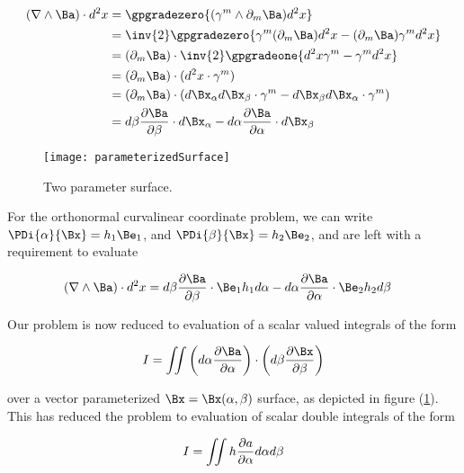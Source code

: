 \begin{align*}
(\grad \wedge \Ba) \cdot d^2 x
&=
\gpgradezero{ (\gamma^m \wedge \partial_m \Ba) d^2 x} \\
&=
\inv{2} \gpgradezero{ \gamma^m (\partial_m \Ba) d^2 x - (\partial_m \Ba) \gamma^m d^2 x} \\
&=
(\partial_m \Ba) \cdot \inv{2} \gpgradeone{ d^2 x \gamma^m - \gamma^m d^2 x} \\
&=
(\partial_m \Ba) \cdot ( d^2 x \cdot \gamma^m ) \\
&=
(\partial_m \Ba) \cdot ( d\Bx_\alpha d\Bx_\beta \cdot \gamma^m - d\Bx_\beta d\Bx_\alpha \cdot \gamma^m) \\
&=
d\beta \PD{\beta}{\Ba} \cdot d\Bx_\alpha -d\alpha \PD{\alpha}{\Ba} \cdot d\Bx_\beta 
\end{align*}

\begin{figure}[htp]
\centering
\texttt{[image: parameterizedSurface]}
\caption{Two parameter surface.}\label{fig:parameterizedSurface}
\end{figure}

For the orthonormal curvalinear coordinate problem, we can write $\PDi{\alpha}{\Bx} = h_1 \Be_1$, and $\PDi{\beta}{\Bx} = h_2 \Be_2$, and are left with a requirement to evaluate

\begin{align*}
(\grad \wedge \Ba) \cdot d^2 x
&=
d\beta \PD{\beta}{\Ba} \cdot \Be_1 h_1 d\alpha -d\alpha \PD{\alpha}{\Ba} \cdot \Be_2 h_2 d\beta
\end{align*}

Our problem is now reduced to evaluation of a scalar valued integrals of the form

\begin{align*}
I = \iint \left( d\alpha \PD{\alpha}{\Ba} \right) \cdot \left( d\beta \PD{\beta}{\Bx} \right)
\end{align*}

over a vector parameterized $\Bx = \Bx(\alpha, \beta)$ surface, as depicted in figure (\ref{fig:parameterizedSurface}).  This has reduced the problem to evaluation of scalar double integrals of the form

\begin{align*}
I = \iint h \frac{\partial {a}}{\partial {\alpha}} d\alpha d\beta 
\end{align*}

\EndNoBibArticle
